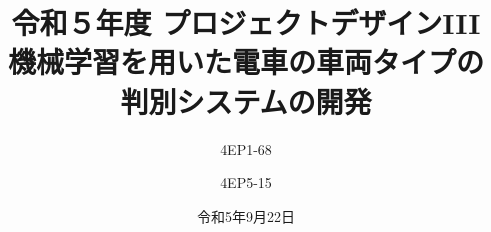 % 
%

\title{
{\normalsize 令和５年度 プロジェクトデザインIII}\\\vspace{10mm}
{\LARGE 機械学習を用いた電車の車両タイプの\\判別システムの開発}
}
\date{令和5年9月22日}
\author{
4EP1-68\\  \and
4EP5-15\\  
}



\usepackage{subcaption}
\usepackage{comment}



\maketitle %
\addtocounter{page}{1}
\thispagestyle{myfirstpage}


